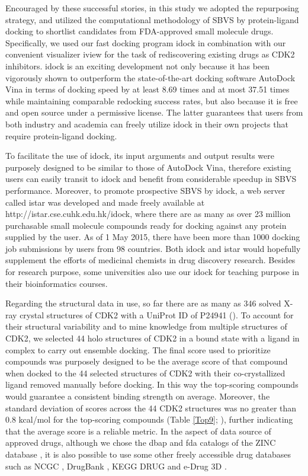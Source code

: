 \documentclass[10pt,letterpaper]{article}
\begin{document}
Encouraged by these successful stories, in this study we adopted the repurposing strategy, and utilized the computational methodology of SBVS by protein-ligand docking to shortlist candidates from FDA-approved small molecule drugs. Specifically, we used our fast docking program idock \cite{1153,1362} in combination with our convenient visualizer iview \cite{1366} for the task of rediscovering existing drugs as CDK2 inhibitors. idock is an exciting development not only because it has been vigorously shown \cite{1362} to outperform the state-of-the-art docking software AutoDock Vina \cite{595} in terms of docking speed by at least 8.69 times and at most 37.51 times while maintaining comparable redocking success rates, but also because it is free and open source under a permissive license. The latter guarantees that users from both industry and academia can freely utilize idock in their own projects that require protein-ligand docking.

To facilitate the use of idock, its input arguments and output results were purposely designed to be similar to those of AutoDock Vina, therefore existing users can easily transit to idock and benefit from considerable speedup in SBVS performance. Moreover, to promote prospective SBVS by idock, a web server called istar \cite{1362} was developed and made freely available at http://istar.cse.cuhk.edu.hk/idock, where there are as many as over 23 million purchasable small molecule compounds ready for docking against any protein supplied by the user. As of 1 May 2015, there have been more than 1000 docking job submissions by users from 98 countries. Both idock \cite{1153} and istar \cite{1362} would hopefully supplement the efforts of medicinal chemists in drug discovery research. Besides for research purpose, some universities also use our idock for teaching purpose in their bioinformatics courses.

Regarding the structural data in use, so far there are as many as 346 solved X-ray crystal structures of CDK2 with a UniProt ID of P24941 (). To account for their structural variability and to mine knowledge from multiple structures of CDK2, we selected 44 holo structures of CDK2 in a bound state with a ligand in complex to carry out ensemble docking. The final score used to prioritize compounds was purposely designed to be the average score of that compound when docked to the 44 selected structures of CDK2 with their co-crystallized ligand removed manually before docking. In this way the top-scoring compounds would guarantee a consistent binding strength on average. Moreover, the standard deviation of scores across the 44 CDK2 structures was no greater than 0.8 kcal/mol for the top-scoring compounds (Table \ref{Top9}; ), further indicating that the average score is a reliable metric. In the aspect of data source of approved drugs, although we chose the dbap and fda catalogs of the ZINC database \cite{532,1178}, it is also possible to use some other freely accessible drug databases such as NCGC \cite{1608}, DrugBank \cite{1594}, KEGG DRUG \cite{1595} and e-Drug 3D \cite{1125}.
\end{document}
